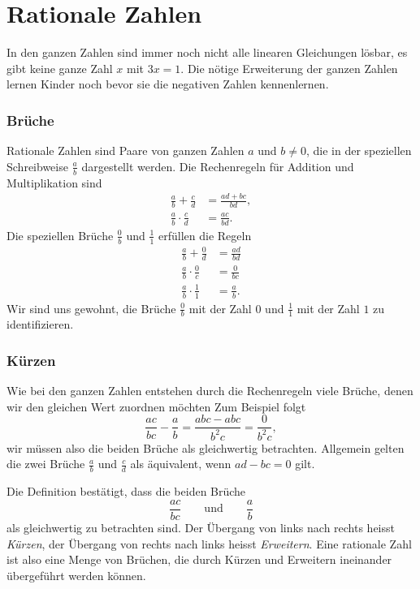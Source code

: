 %
%
%
\section{Rationale Zahlen
\label{buch:section:rationale-zahlen}}
In den ganzen Zahlen sind immer noch nicht alle linearen Gleichungen
lösbar, es gibt keine ganze Zahl $x$ mit $3x=1$.
Die nötige Erweiterung der ganzen Zahlen lernen Kinder noch bevor sie
die negativen Zahlen kennenlernen.

\subsubsection{Brüche}
Rationale Zahlen sind Paare von ganzen Zahlen $a$ und $b\ne 0$,
die in der speziellen Schreibweise $\frac{a}{b}$ dargestellt werden.
Die Rechenregeln für Addition und Multiplikation sind
\begin{align*}
\frac{a}{b}+\frac{c}{d}
&=
\frac{ad+bc}{bd},
\\
\frac{a}{b}\cdot\frac{c}{d}
&=
\frac{ac}{bd}.
\end{align*}
Die speziellen Brüche $\frac{0}{b}$ und $\frac{1}{1}$ erfüllen die
Regeln
\begin{align*}
\frac{a}{b}+\frac{0}{d} &= \frac{ad}{bd}
\\
\frac{a}{b}\cdot \frac{0}{c} &= \frac{0}{bc}
\\
\frac{a}{b}\cdot \frac{1}{1} &= \frac{a}{b}.
\end{align*}
Wir sind uns gewohnt, die Brüche $\frac{0}{b}$ mit der Zahl $0$ und
$\frac{1}{1}$ mit der Zahl $1$ zu identifizieren.

\subsubsection{Kürzen}
Wie bei den ganzen Zahlen entstehen durch die Rechenregeln viele Brüche,
denen wir den gleichen Wert zuordnen möchten
Zum Beispiel folgt
\[
\frac{ac}{bc} - \frac{a}{b} 
=
\frac{abc-abc}{b^2c}
=
\frac{0}{b^2c},
\]
wir müssen also die beiden Brüche als gleichwertig betrachten.
Allgemein gelten die zwei Brüche $\frac{a}{b}$ und $\frac{c}{d}$
als äquivalent, wenn $ad-bc= 0$ gilt.

Die Definition bestätigt, dass die beiden Brüche
\[
\frac{ac}{bc} 
\qquad\text{und}\qquad
\frac{a}{b}
\]
als gleichwertig zu betrachten sind.
Der Übergang von links nach rechts heisst {\em Kürzen},
%
der Übergang von rechts nach links heisst {\em Erweitern}.
%
Eine rationale Zahl ist also eine Menge von Brüchen, die durch
Kürzen und Erweitern ineinander übergeführt werden können.

